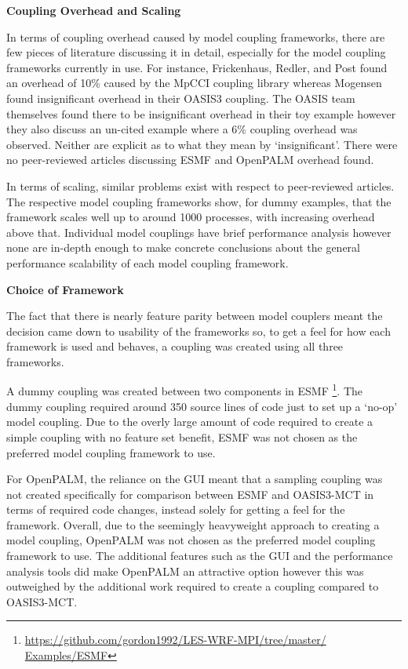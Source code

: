 \textbf{Coupling Overhead and Scaling}

In terms of coupling overhead caused by model coupling frameworks, there are few
pieces of literature discussing it in detail, especially for the model coupling
frameworks currently in use. For instance, Frickenhaus, Redler, and Post
\cite{StephanFrickenhausReneRedler2001} found an overhead of 10\% caused by the
MpCCI coupling library whereas Mogensen \cite{Mogensen} found insignificant
overhead in their OASIS3 coupling. The OASIS team themselves found there to be
insignificant overhead in their toy example \cite{Valcke} however they also
discuss an un-cited example where a 6\% coupling overhead was observed. Neither
are explicit as to what they mean by `insignificant'. There were no
peer-reviewed articles discussing ESMF and OpenPALM overhead found.

In terms of scaling, similar problems exist with respect to peer-reviewed
articles. The respective model coupling frameworks show, for dummy examples,
that the framework scales well up to around 1000 processes, with increasing
overhead above that. Individual model couplings have brief performance analysis
however none are in-depth enough to make concrete conclusions about the general
performance scalability of each model coupling framework.

\textbf{Choice of Framework}

The fact that there is nearly feature parity between model couplers meant the
decision came down to usability of the frameworks so, to get a feel for how each
framework is used and behaves, a coupling was created using all three
frameworks.

A dummy coupling was created between two components in ESMF
\footnote{\url{https://github.com/gordon1992/LES-WRF-MPI/tree/master/
Examples/ESMF}}. The dummy coupling required around 350 source lines of code
just to set up a `no-op' model coupling. Due to the overly large amount of code
required to create a simple coupling with no feature set benefit, ESMF was not
chosen as the preferred model coupling framework to use.

For OpenPALM, the reliance on the GUI meant that a sampling coupling was not
created specifically for comparison between ESMF and OASIS3-MCT in terms of
required code changes, instead solely for getting a feel for the framework.
Overall, due to the seemingly heavyweight approach to creating a model coupling,
OpenPALM was not chosen as the preferred model coupling framework to use. The
additional features such as the GUI and the performance analysis tools did make
OpenPALM an attractive option however this was outweighed by the additional work
required to create a coupling compared to OASIS3-MCT.

